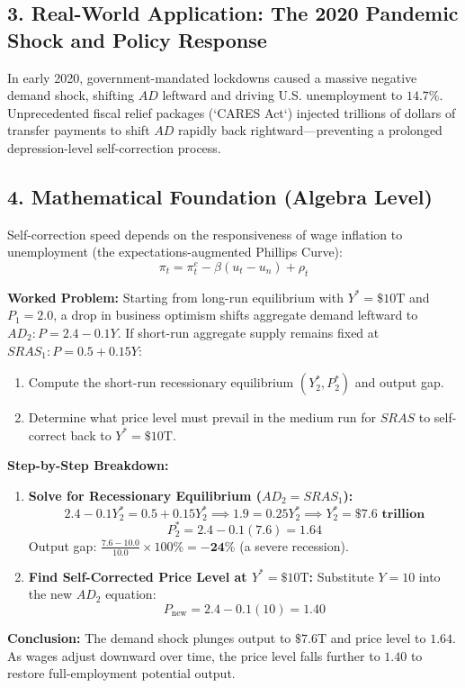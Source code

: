 \documentclass[11pt,letterpaper]{article}
\begin{document}
\subsection*{3. Real-World Application: The 2020 Pandemic Shock and Policy Response}
In early 2020, government-mandated lockdowns caused a massive negative demand shock, shifting $AD$ leftward and driving U.S. unemployment to $14.7\%$. Unprecedented fiscal relief packages (`CARES Act`) injected trillions of dollars of transfer payments to shift $AD$ rapidly back rightward—preventing a prolonged depression-level self-correction process.

\subsection*{4. Mathematical Foundation (Algebra Level)}
Self-correction speed depends on the responsiveness of wage inflation to unemployment (the expectations-augmented Phillips Curve):
\begin{equation}
\pi_t = \pi_t^e - \beta(u_t - u_n) + \rho_t
\end{equation}

\noindent\textbf{Worked Problem:}
Starting from long-run equilibrium with $Y^* = \$10\text{T}$ and $P_1 = 2.0$, a drop in business optimism shifts aggregate demand leftward to $AD_2: P = 2.4 - 0.1Y$. If short-run aggregate supply remains fixed at $SRAS_1: P = 0.5 + 0.15Y$:
\begin{enumerate}
    \item Compute the short-run recessionary equilibrium $(Y_2^*, P_2^*)$ and output gap.
    \item Determine what price level must prevail in the medium run for $SRAS$ to self-correct back to $Y^* = \$10\text{T}$.
\end{enumerate}

\noindent\textbf{Step-by-Step Breakdown:}
\begin{enumerate}
    \item \textbf{Solve for Recessionary Equilibrium ($AD_2 = SRAS_1$):}
    \[
    2.4 - 0.1Y_2^* = 0.5 + 0.15Y_2^* \implies 1.9 = 0.25Y_2^* \implies Y_2^* = \mathbf{\$7.6\text{ trillion}}
    \]
    \[
    P_2^* = 2.4 - 0.1(7.6) = \mathbf{1.64}
    \]
    Output gap: $\frac{7.6 - 10.0}{10.0} \times 100\% = \mathbf{-24\%}$ (a severe recession).

    \item \textbf{Find Self-Corrected Price Level at $Y^* = \$10\text{T}$:}
    Substitute $Y = 10$ into the new $AD_2$ equation:
    \[
    P_{\text{new}} = 2.4 - 0.1(10) = \mathbf{1.40}
    \]
\end{enumerate}
\textbf{Conclusion:} The demand shock plunges output to $\$7.6\text{T}$ and price level to $1.64$. As wages adjust downward over time, the price level falls further to $1.40$ to restore full-employment potential output.
\end{document}
